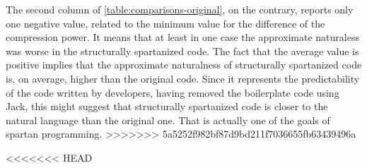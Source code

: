 The second column of \cref{table:comparisons-original}, on the contrary, reports only 
one negative value, related to the minimum value for the difference of the compression power. 
It means that at least in one case the approximate naturaless was worse in the 
structurally spartanized code. The fact that the average value is positive implies
that the approximate naturalness of structurally spartanized
code is, on average, higher than the original code. Since it represents the predictability of
the code written by developers, having removed the boilerplate code using Jack, this
might suggest that structurally spartanized code is closer to the natural language
than the original one. That is actually one of the goals of spartan programming. 
>>>>>>> 5a5252f982bf87d9bd211f7036655fb63439496a


<<<<<<< HEAD

